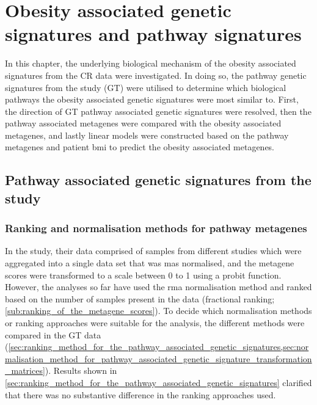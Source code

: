 \chapter{Obesity associated genetic signatures and pathway signatures}
\label{cha:obesity_associated_genetic_signature_and_pathway_signatures}

In this chapter, the underlying biological mechanism of the obesity associated signatures from the CR data were investigated.
In doing so, the pathway genetic signatures from the \citet{Gatza2010a} study (GT) were utilised to determine which biological pathways the obesity associated genetic signatures were most similar to.
First, the direction of GT pathway associated genetic signatures were resolved, then the pathway associated metagenes were compared with the obesity associated metagenes, and lastly linear models were constructed based on the pathway metagenes and patient \gls{bmi} to predict the obesity associated metagenes.

\vspace{-3mm}

\section{Pathway associated genetic signatures from the\\\citet{Gatza2010a} study}
\label{sec:pathway_associated_genetic_signatures_from_gatza2010a_study}

\subsection{Ranking and normalisation methods for pathway metagenes}
\label{sub:ranking_and_normalisation_methods}

In the \citet{Gatza2010a} study, their data comprised of samples from different studies which were aggregated into a single data set that was \gls{mas} normalised, and the metagene scores were transformed to a scale between 0 to 1 using a probit function.
However, the analyses so far have used the \gls{rma} normalisation method and ranked based on the number of samples present in the data (fractional ranking; \cref{sub:ranking_of_the_metagene_scores}).
To decide which normalisation methods or ranking approaches were suitable for the analysis, the different methods were compared in the GT data (\cref{sec:ranking_method_for_the_pathway_associated_genetic_signatures,sec:normalisation_method_for_pathway_associated_genetic_signature_transformation_matrices}).
Results shown in \cref{sec:ranking_method_for_the_pathway_associated_genetic_signatures} clarified that there was no substantive difference in the ranking approaches used.

